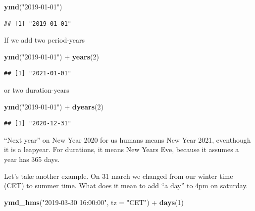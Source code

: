 \documentclass[]{tufte-book}
\newenvironment{Shaded}{}{}
\newcommand{\DataTypeTok}[1]{\textcolor[rgb]{0.56,0.13,0.00}{#1}}
\newcommand{\DecValTok}[1]{\textcolor[rgb]{0.25,0.63,0.44}{#1}}
\newcommand{\KeywordTok}[1]{\textcolor[rgb]{0.00,0.44,0.13}{\textbf{#1}}}
\newcommand{\NormalTok}[1]{#1}
\newcommand{\OperatorTok}[1]{\textcolor[rgb]{0.40,0.40,0.40}{#1}}
\newcommand{\StringTok}[1]{\textcolor[rgb]{0.25,0.44,0.63}{#1}}
\begin{document}
\begin{Shaded}
\begin{Highlighting}[]
\KeywordTok{ymd}\NormalTok{(}\StringTok{"2019-01-01"}\NormalTok{)}
\end{Highlighting}
\end{Shaded}

\begin{verbatim}
## [1] "2019-01-01"
\end{verbatim}

If we add two period-years

\begin{Shaded}
\begin{Highlighting}[]
\KeywordTok{ymd}\NormalTok{(}\StringTok{"2019-01-01"}\NormalTok{) }\OperatorTok{+}\StringTok{ }\KeywordTok{years}\NormalTok{(}\DecValTok{2}\NormalTok{)}
\end{Highlighting}
\end{Shaded}

\begin{verbatim}
## [1] "2021-01-01"
\end{verbatim}

or two duration-years

\begin{Shaded}
\begin{Highlighting}[]
\KeywordTok{ymd}\NormalTok{(}\StringTok{"2019-01-01"}\NormalTok{) }\OperatorTok{+}\StringTok{ }\KeywordTok{dyears}\NormalTok{(}\DecValTok{2}\NormalTok{)}
\end{Highlighting}
\end{Shaded}

\begin{verbatim}
## [1] "2020-12-31"
\end{verbatim}

``Next year'' on New Year 2020 for us humans means New Year 2021, eventhough it is a leapyear. For durations, it means New Years Eve, because it assumes a year has 365 days.

Let's take another example. On 31 march we changed from our winter time (CET) to summer time. What does it mean to add ``a day'' to 4pm on saturday.

\begin{Shaded}
\begin{Highlighting}[]
\KeywordTok{ymd_hms}\NormalTok{(}\StringTok{"2019-03-30 16:00:00"}\NormalTok{, }\DataTypeTok{tz =} \StringTok{"CET"}\NormalTok{) }\OperatorTok{+}\StringTok{ }\KeywordTok{days}\NormalTok{(}\DecValTok{1}\NormalTok{)}
\end{Highlighting}
\end{Shaded}
\end{document}
